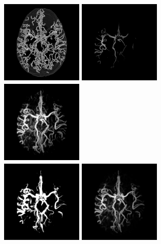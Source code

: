 \begin{figure}[H]
  \centering
  \includegraphics[clip = true, trim = 90 20 90 20, height=4cm,width=3.9cm]{Images/Bullitt_GT.png}
  \includegraphics[clip = true, trim = 90 20 90 20, height=4cm,width=3.9cm]{Images/Bullitt_Baseline.png}
  \includegraphics[clip = true, trim = 90 20 90 20, height=4cm,width=3.9cm]{Images/Bullitt_Frangi.png}
  \\
  \includegraphics[clip = true, trim = 90 20 90 20, height=4cm,width=3.9cm]{Images/Bullitt_Jerman.png}
  \includegraphics[clip = true, trim = 90 20 90 20, height=4cm,width=3.9cm]{Images/Bullitt_OOF_GM.png}

\end{figure}
